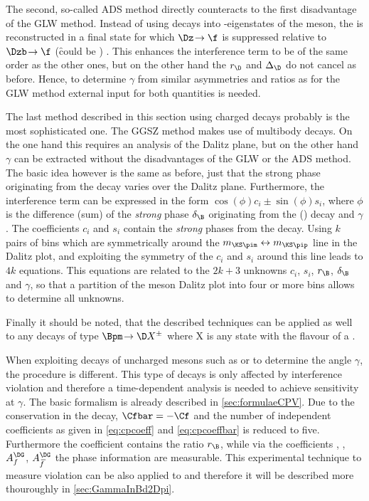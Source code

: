 The second, so-called ADS method directly counteracts to the first disadvantage of the GLW method.
Instead of using decays into \CP-eigenstates of the \D meson, the \D is reconstructed in a final state for which $\Dz\!\to\f$ is suppressed relative to $\Dzb\!\to\f$ (\eg \f could be \Km\pip) \cite{ADS}.
This enhances the interference term to be of the same order as the other ones, but on the other hand the $r_\D$ and $\Delta_\D$ do not cancel as before.
Hence, to determine $\gamma$ from similar asymmetries and ratios as for the GLW method external input for both quantities is needed.

The last method described in this section using charged \B decays probably is the most sophisticated one.
The GGSZ method makes use of multibody \D decays.
On the one hand this requires an analysis of the Dalitz plane, but on the other hand $\gamma$ can be extracted without the disadvantages of the GLW or the ADS method.
The basic idea however is the same as before, just that the strong phase originating from the \D decay varies over the Dalitz plane.
Furthermore, the interference term can be expressed in the form $\cos\!\left(\phi\right)c_i\pm\sin\!\left(\phi\right)s_i$, where $\phi$ is the difference (sum) of the \emph{strong} phase $\delta_\B$ originating from the \Bm (\Bp) decay and $\gamma$.
The coefficients $c_i$ and $s_i$ contain the \emph{strong} phases from the \D decay.
Using $k$ pairs of bins which are symmetrically around the $m_{\KS\pim}\leftrightarrow m_{\KS\pip}$ line in the Dalitz plot, and exploiting the symmetry of the $c_i$ and $s_i$ around this line leads to $4k$ equations.
This equations are related to the $2k+3$ unknowns $c_i$, $s_i$, $r_\B$, $\delta_\B$ and $\gamma$, so that a partition of the \D meson Dalitz plot into four or more bins allows to determine all unknowns.

Finally it should be noted, that the described techniques can be applied as well to any decays of type $\Bpm\!\to\D X^{\pm}$ where X is any state with the flavour of a \Kpm.

When exploiting decays of uncharged \B mesons such as \mbox{\BsToDsK} or \mbox{\BdToDpi} to determine the angle $\gamma$, the procedure is different.
This type of decays is only affected by interference \CP violation and therefore a time-dependent analysis is needed to achieve sensitivity at $\gamma$.
The basic formalism is already described in \cref{sec:formulaeCPV}.
Due to the \CP conservation in the decay, $\Cfbar=-\Cf$ and the number of independent coefficients as given in \cref{eq:cpcoeff} and \cref{eq:cpcoeffbar} is reduced to five.
Furthermore the \CP coefficient \Cf contains the ratio $r_\B$, while via the coefficients \Sf, \Sfbar, $A_f^{\DG}$, $A_{\kern 1.5pt\overline{\kern -1.5pt f\kern 1.5pt}}^{\DG}$ the phase information are measurable.
This experimental technique to measure \CP violation can be also applied to \BdToDpi and therefore it will be described more thouroughly in \cref{sec:GammaInBd2Dpi}.


